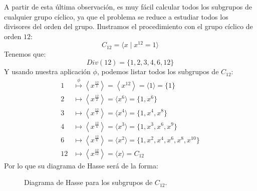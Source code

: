 \begin{ejemplo}
    A partir de esta última observación, es muy fácil calcular todos los subgrupos de cualquier grupo cíclico, ya que el problema se reduce a estudiar todos los divisores del orden del grupo. Ilustramos el procedimiento con el grupo cíclico de orden $12$:
    \begin{equation*}
        C_{12} = \langle x\mid x^{12} = 1 \rangle 
    \end{equation*}
    Tenemos que:
    \begin{equation*}
        Div(12) = \{1, 2, 3, 4, 6, 12\}
    \end{equation*}
    Y usando nuestra aplicación $\phi$, podemos listar todos los subgrupos de $C_{12}$:
    \begin{align*}
        1 &\stackrel{\phi}{\longmapsto} \left\langle x^{\frac{12}{1}} \right\rangle = \left\langle x^{12} \right\rangle  = \langle 1 \rangle  = \{1\} \\
        2 &\longmapsto \left\langle x^{\frac{12}{2}} \right\rangle = \langle x^{6} \rangle  = \{1, x^6\} \\
        3 &\longmapsto \left\langle x^{\frac{12}{3}} \right\rangle = \langle x^4 \rangle = \{1, x^4, x^8\} \\
        4 &\longmapsto \left\langle x^{\frac{12}{4}} \right\rangle  = \langle x^3 \rangle = \{1, x^3, x^6, x^9\} \\
        6 &\longmapsto \left\langle x^{\frac{12}{6}} \right\rangle = \langle x^2 \rangle = \{1, x^2, x^4, x^6, x^8, x^{10}\} \\
        12 &\longmapsto \left\langle x^{\frac{12}{12}} \right\rangle = \langle x \rangle  = C_{12}
    \end{align*}
    Por lo que su diagrama de Hasse será de la forma: 
    \begin{figure}[H]
        \centering
        \caption{Diagrama de Hasse para los subgrupos de ${C}_{12}$.}
        \label{fig:hasse_c12}
    \end{figure}
\end{ejemplo}

